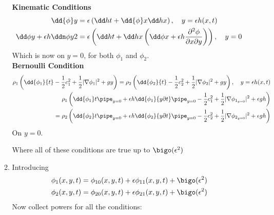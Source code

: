 \documentclass{/home/janmebows/Documents/LatexTemplates/myassignment}
\begin{document}
\begin{enumerate}
\begin{enumerate}
        \textbf{Kinematic Conditions}
        \begin{align*}
            \dd{\phi}y &= \epsilon \left(\dd ht + \dd{\phi}x \dd hx \right), \quad y=\epsilon h(x,t)\\
            \dd\phi y + \epsilon h \ddn \phi y2  &= \epsilon\left(\dd h t + \dd hx \left(\dd\phi x + \epsilon h \frac{\partial^2 \phi}{\partial x \partial y}\right)\right),\quad y=0
        \end{align*}
        Which is now on $y=0$, for both $\phi_1$ and $\phi_2$.\\
        \textbf{Bernoulli Condition}
        \begin{align*}
            \rho_1 \left(\dd{\phi_1}{t} - \frac12 c_1^2 + \frac12 |\nabla \phi_1|^2 + gy \right) = \rho_2 \left(\dd{\phi_2}{t} - \frac12 c_2^2 + \frac12 |\nabla \phi_2|^2 + gy \right) , \quad y=\epsilon h(x,t)\\
            \rho_1\left(\dd{\phi_1} t\pipe_{y=0} + \epsilon h\dd{\phi_1}{y\partial t} \pipe_{y=0} -\frac12 c_1^2 + \frac12 |\nabla\phi_{1_{y=0}}|^2 + \epsilon g h\right)\\
            =\rho_2\left(\dd{\phi_2} t\pipe_{y=0} + \epsilon h\dd{\phi_2}{y\partial t} \pipe_{y=0}-\frac12 c_2^2 + \frac12 |\nabla \phi_{2_{y=0}}|^2 + \epsilon gh\right)\\
        \end{align*}
        On $y=0$.

        Where all of these conditions are true up to $\bigo(\epsilon^2)$
        \item %
        Introducing
        \begin{align*}
            \phi_1(x,y,t) = \phi_{10}(x,y,t) + \epsilon\phi_{11}(x,y,t) + \bigo(\epsilon^2)\\
            \phi_2(x,y,t) = \phi_{20}(x,y,t) + \epsilon\phi_{21}(x,y,t) + \bigo(\epsilon^2)\\
        \end{align*}
        Now collect powers for all the conditions:


\end{enumerate}
\end{enumerate}
\end{document}
